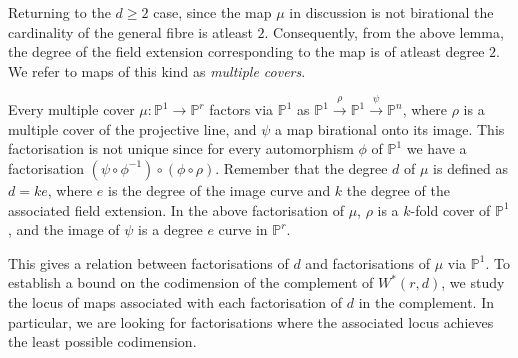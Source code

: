 Returning to the $d \geq 2$ case, since the map $\mu$ in discussion is not birational the cardinality of the general fibre is atleast $2$.
Consequently, from the above lemma, the degree of the field extension corresponding to the map is of atleast degree $2$.
We refer to maps of this kind as \textit{multiple covers}.
\par Every multiple cover $\mu: \mathbb{P}^{1} \to \mathbb{P}^{r}$ factors via $\mathbb{P}^{1}$ as $\mathbb{P}^{1} \xrightarrow{\rho} \mathbb{P}^{1} \xrightarrow{\psi} \mathbb{P}^{n} $, where $\rho$ is a multiple cover of the projective line, and $\psi$ a map birational onto its image.
This factorisation is not unique since for every automorphism $\phi$ of $\mathbb{P}^{1}$ we have a factorisation $(\psi \circ \phi^{-1}) \circ (\phi \circ \rho)$. 
Remember that the degree $d$ of $\mu$ is defined as $d = ke$, where $e$ is the degree of the image curve and $k$ the degree of the associated field extension.
In the above factorisation of $\mu$, $\rho$ is a $k$-fold cover of $\mathbb{P}^{1}$, and the image of $\psi$ is a degree $e$ curve in $\mathbb{P}^{r}$.
\par This gives a relation between factorisations of $d$ and factorisations of $\mu$ via $\mathbb{P}^{1}$. 
To establish a bound on the codimension of the complement of $W^{*}(r,d)$, we study the locus of maps associated with each factorisation of $d$ in the complement.
In particular, we are looking for factorisations where the associated locus achieves the least possible codimension.


